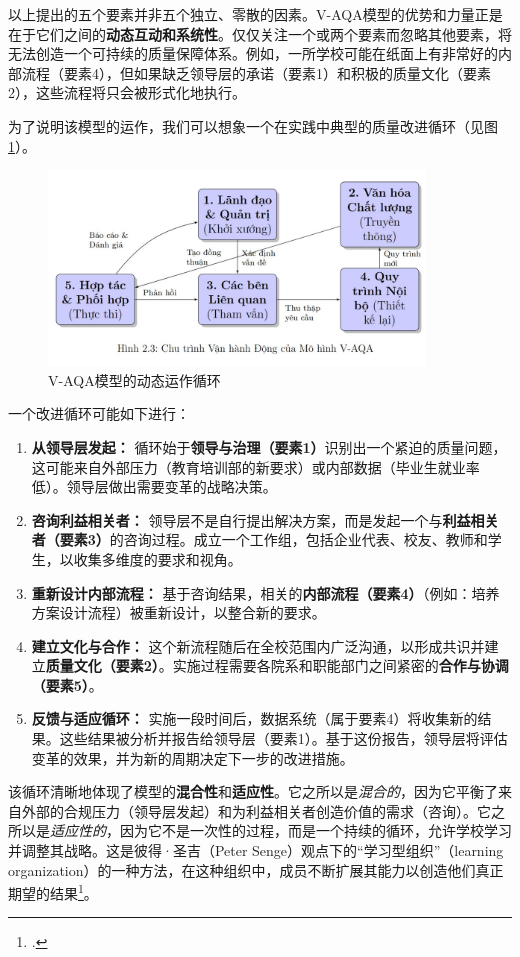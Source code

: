 以上提出的五个要素并非五个独立、零散的因素。V-AQA模型的优势和力量正是在于它们之间的\textbf{动态互动和系统性}。仅仅关注一个或两个要素而忽略其他要素，将无法创造一个可持续的质量保障体系。例如，一所学校可能在纸面上有非常好的内部流程（要素4），但如果缺乏领导层的承诺（要素1）和积极的质量文化（要素2），这些流程将只会被形式化地执行。

为了说明该模型的运作，我们可以想象一个在实践中典型的质量改进循环（见图\ref{fig:v-aqa-cycle}）。

\begin{figure}[h!]
    \centering
    \includegraphics[width=0.9\textwidth]{image/chu_trinh_van_hanh_V-AQA.jpg}
    \caption{V-AQA模型的动态运作循环}
    \label{fig:v-aqa-cycle}
\end{figure}


一个改进循环可能如下进行：
\begin{enumerate}
    \item \textbf{从领导层发起：} 循环始于\textbf{领导与治理（要素1）}识别出一个紧迫的质量问题，这可能来自外部压力（教育培训部的新要求）或内部数据（毕业生就业率低）。领导层做出需要变革的战略决策。
    \item \textbf{咨询利益相关者：} 领导层不是自行提出解决方案，而是发起一个与\textbf{利益相关者（要素3）}的咨询过程。成立一个工作组，包括企业代表、校友、教师和学生，以收集多维度的要求和视角。
    \item \textbf{重新设计内部流程：} 基于咨询结果，相关的\textbf{内部流程（要素4）}（例如：培养方案设计流程）被重新设计，以整合新的要求。
    \item \textbf{建立文化与合作：} 这个新流程随后在全校范围内广泛沟通，以形成共识并建立\textbf{质量文化（要素2）}。实施过程需要各院系和职能部门之间紧密的\textbf{合作与协调（要素5）}。
    \item \textbf{反馈与适应循环：} 实施一段时间后，数据系统（属于要素4）将收集新的结果。这些结果被分析并报告给领导层（要素1）。基于这份报告，领导层将评估变革的效果，并为新的周期决定下一步的改进措施。
\end{enumerate}
该循环清晰地体现了模型的\textbf{混合性}和\textbf{适应性}。它之所以是\textit{混合的}，因为它平衡了来自外部的合规压力（领导层发起）和为利益相关者创造价值的需求（咨询）。它之所以是\textit{适应性的}，因为它不是一次性的过程，而是一个持续的循环，允许学校学习并调整其战略。这是彼得·圣吉（Peter Senge）观点下的“学习型组织”（learning organization）的一种方法，在这种组织中，成员不断扩展其能力以创造他们真正期望的结果\footcite{Senge2006}。


